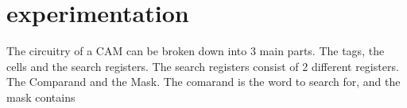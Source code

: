 \section{experimentation}
The circuitry of a CAM can be broken down into 3 main parts. The tags, the cells and the search registers. 
The search registers consist of 2 different registers. 
The Comparand and the Mask. The comarand is the word to search for, and the mask contains